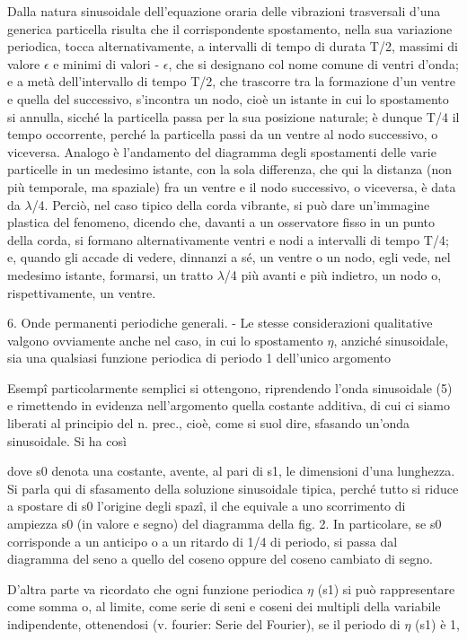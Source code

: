 \documentclass[a4paper]{article}
\begin{document}
Dalla natura sinusoidale dell'equazione oraria delle vibrazioni trasversali d'una generica particella risulta che il corrispondente spostamento, nella sua variazione periodica, tocca alternativamente, a intervalli di tempo di durata T/2, massimi di valore $\epsilon$ e minimi di valori - $\epsilon$, che si designano col nome comune di ventri d'onda; e a metà dell'intervallo di tempo T/2, che trascorre tra la formazione d'un ventre e quella del successivo, s'incontra un nodo, cioè un istante in cui lo spostamento si annulla, sicché la particella passa per la sua posizione naturale; è dunque T/4 il tempo occorrente, perché la particella passi da un ventre al nodo successivo, o viceversa. Analogo è l'andamento del diagramma degli spostamenti delle varie particelle in un medesimo istante, con la sola differenza, che qui la distanza (non più temporale, ma spaziale) fra un ventre e il nodo successivo, o viceversa, è data da $\lambda$/4. Perciò, nel caso tipico della corda vibrante, si può dare un'immagine plastica del fenomeno, dicendo che, davanti a un osservatore fisso in un punto della corda, si formano alternativamente ventri e nodi a intervalli di tempo T/4; e, quando gli accade di vedere, dinnanzi a sé, un ventre o un nodo, egli vede, nel medesimo istante, formarsi, un tratto $\lambda$/4 più avanti e più indietro, un nodo o, rispettivamente, un ventre.

6. Onde permanenti periodiche generali. - Le stesse considerazioni qualitative valgono ovviamente anche nel caso, in cui lo spostamento $\eta$, anziché sinusoidale, sia una qualsiasi funzione periodica di periodo 1 dell'unico argomento

Esempî particolarmente semplici si ottengono, riprendendo l'onda sinusoidale (5) e rimettendo in evidenza nell'argomento quella costante additiva, di cui ci siamo liberati al principio del n. prec., cioè, come si suol dire, sfasando un'onda sinusoidale. Si ha così

dove s0 denota una costante, avente, al pari di s1, le dimensioni d'una lunghezza. Si parla qui di sfasamento della soluzione sinusoidale tipica, perché tutto si riduce a spostare di s0 l'origine degli spazî, il che equivale a uno scorrimento di ampiezza s0 (in valore e segno) del diagramma della fig. 2. In particolare, se s0 corrisponde a un anticipo o a un ritardo di 1/4 di periodo, si passa dal diagramma del seno a quello del coseno oppure del coseno cambiato di segno.

D'altra parte va ricordato che ogni funzione periodica $\eta$ (s1) si può rappresentare come somma o, al limite, come serie di seni e coseni dei multipli della variabile indipendente, ottenendosi (v. fourier: Serie del Fourier), se il periodo di $\eta$ (s1) è 1,
\end{document}
